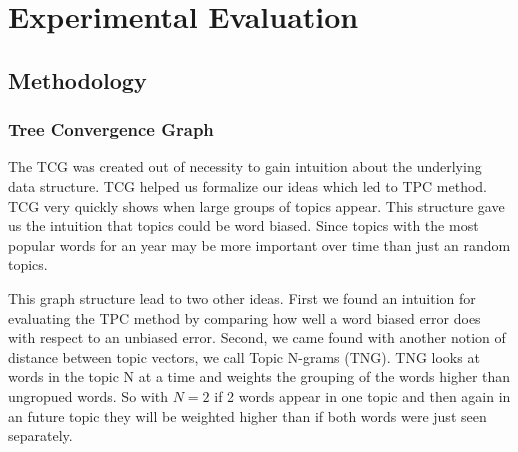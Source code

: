 \documentclass[conference]{IEEEtran}
\begin{document}

\section{Experimental Evaluation}


\subsection{Methodology}

\subsubsection{Tree Convergence Graph}
The TCG was created out of necessity to gain intuition about the underlying data structure. TCG helped us formalize our ideas which led to TPC method. TCG very quickly shows when large groups of topics appear. This structure gave us the intuition that topics could be word biased. Since topics with the most popular words for an year may be more important over time than just an random topics.     

This graph structure lead to two other ideas. First we found an intuition for evaluating the TPC method by comparing how well a word biased error does with respect to an unbiased error. Second, we came found with another notion of distance between topic vectors, we call Topic N-grams (TNG). TNG looks at words in the topic N at a time and weights the grouping of the words higher than ungropued words. So with $N=2$ if 2 words appear in one topic and then again in an future topic they will be weighted higher than if both words were just seen separately.
\end{document}

